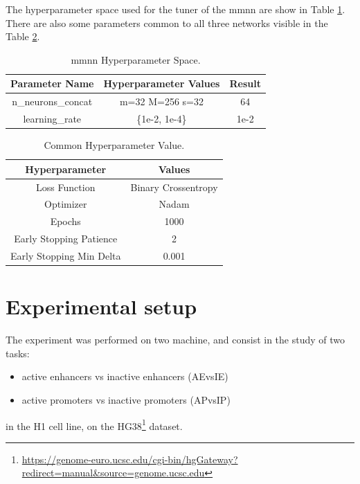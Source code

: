 \documentclass{article}
\begin{document}
\noindent
The hyperparameter space used for the tuner of the \acrshort{mmnn} are show in Table \ref{tab:MMNN_Hyperparameter}. There are also some parameters common to all three networks visible in the Table \ref{tab:Common_Hyperparameter}.

\begin{table}[!ht]
\begin{center}
\begin{tabular}{||c | c | c ||} 
 \hline
 Parameter Name & Hyperparameter Values & Result\\ [0.5ex] 
 \hline\hline
 n\_neurons\_concat & \acrshort{m}=32 \acrshort{M}=256 \acrshort{s}=32 & 64\\
 \hline
 learning\_rate & \{1e-2, 1e-4\} & 1e-2\\
 \hline
\end{tabular}
\caption{\label{tab:MMNN_Hyperparameter} \acrshort{mmnn} Hyperparameter Space.}
\end{center}
\end{table}

\begin{table}[!ht]
\begin{center}
\begin{tabular}{||c | c ||} 
 \hline
 Hyperparameter & Values\\ [0.5ex] 
 \hline\hline
 Loss Function & Binary Crossentropy   \\
 \hline
 Optimizer & Nadam  \\
 \hline
 Epochs & 1000  \\
 \hline
 Early Stopping Patience & 2    \\
 \hline
 Early Stopping Min Delta & 0.001   \\
 \hline
\end{tabular}
\caption{\label{tab:Common_Hyperparameter} Common Hyperparameter Value.}
\end{center}
\end{table}

\section{Experimental setup}
\label{sec:Experimental_Setup}
The experiment was performed on two machine, and consist in the study of two tasks:
\begin{itemize}
    \item active enhancers vs inactive enhancers (AEvsIE)
    \item active promoters vs inactive promoters (APvsIP)
\end{itemize}
in the H1 \cite{hergeth2015h1} cell line, on the HG38\footnote{\url{https://genome-euro.ucsc.edu/cgi-bin/hgGateway?redirect=manual&source=genome.ucsc.edu}} dataset.
\end{document}
